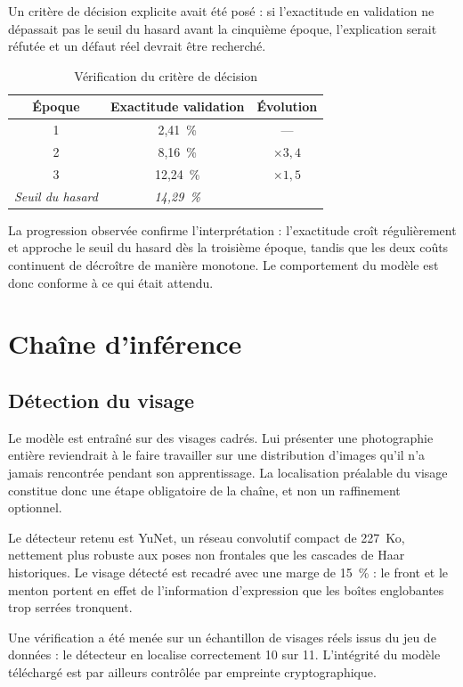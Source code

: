 \documentclass[a4paper,12pt]{report}
\begin{document}
Un critère de décision explicite avait été posé : si l'exactitude en validation
ne dépassait pas le seuil du hasard avant la cinquième époque, l'explication
serait réfutée et un défaut réel devrait être recherché.

\begin{table}[htbp]
\centering
\caption{Vérification du critère de décision}
\begin{tabular}{|c|c|c|}
\hline
\textbf{Époque} & \textbf{Exactitude validation} & \textbf{Évolution} \\
\hline
1 & 2{,}41~\% & --- \\
2 & 8{,}16~\% & $\times 3{,}4$ \\
3 & 12{,}24~\% & $\times 1{,}5$ \\
\hline
\textit{Seuil du hasard} & \textit{14{,}29~\%} & \\
\hline
\end{tabular}
\end{table}

La progression observée confirme l'interprétation : l'exactitude croît
régulièrement et approche le seuil du hasard dès la troisième époque, tandis que
les deux coûts continuent de décroître de manière monotone. Le comportement du
modèle est donc conforme à ce qui était attendu.

\section{Chaîne d'inférence}

\subsection{Détection du visage}

Le modèle est entraîné sur des visages cadrés. Lui présenter une photographie
entière reviendrait à le faire travailler sur une distribution d'images qu'il
n'a jamais rencontrée pendant son apprentissage. La localisation préalable du
visage constitue donc une étape obligatoire de la chaîne, et non un raffinement
optionnel.

Le détecteur retenu est YuNet, un réseau convolutif compact de 227~Ko, nettement
plus robuste aux poses non frontales que les cascades de Haar historiques. Le
visage détecté est recadré avec une marge de 15~\% : le front et le menton
portent en effet de l'information d'expression que les boîtes englobantes
trop serrées tronquent.

Une vérification a été menée sur un échantillon de visages réels issus du jeu de
données : le détecteur en localise correctement 10 sur 11. L'intégrité du modèle
téléchargé est par ailleurs contrôlée par empreinte cryptographique.
\end{document}
